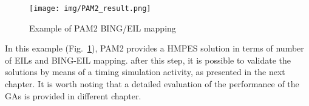 %
\begin{figure}[!ht]
\centerline{\texttt{[image: img/PAM2\_result.png]}}
\caption{Example of PAM2 BING/EIL mapping\label{figure4_2_PAM2}}
\end{figure}
%
In this example (Fig.~\ref{figure4_2_PAM2}), PAM2 provides a HMPES solution in terms of number of EILs and BING-EIL mapping. after this step, it is possible to validate the solutions by means of a timing simulation activity, as presented in the next chapter. It is worth noting that a detailed evaluation of the performance of the GAs is provided in different chapter.
%
%
%
%
%
%
%
%
%
%
%
%
%
%
%
%
%
%
